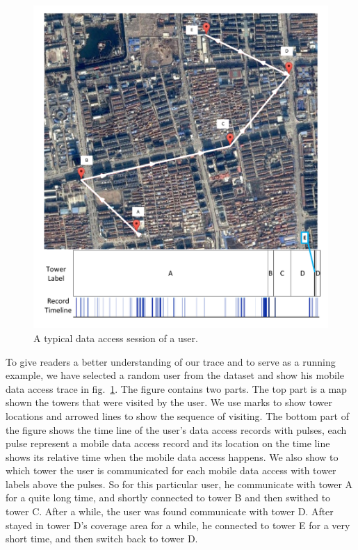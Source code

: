 \begin{figure}[h]
    \centering
    \includegraphics[width=\linewidth]{./figures/typical_user.pdf}
    \caption{A typical data access session of a user.}
    \label{fig:typical_user}
\end{figure}

To give readers a better understanding of our trace and to serve as a running example, we have selected a random user from the dataset and show his mobile data access trace in fig.~\ref{fig:typical_user}. The figure contains two parts. The top part is a map shown the towers that were visited by the user. We use marks to show tower locations and arrowed lines to show the sequence of visiting. The bottom part of the figure shows the time line of the user's data access records with pulses, each pulse represent a mobile data access record and its location on the time line shows its relative time when the mobile data access happens. We also show to which tower the user is communicated for each mobile data access with tower labels above the pulses. So for this particular user, he communicate with tower A for a quite long time, and shortly connected to tower B and then swithed to tower C. After a while, the user was found communicate with tower D. After stayed in tower D's coverage area for a while, he connected to tower E for a very short time, and then switch back to tower D.